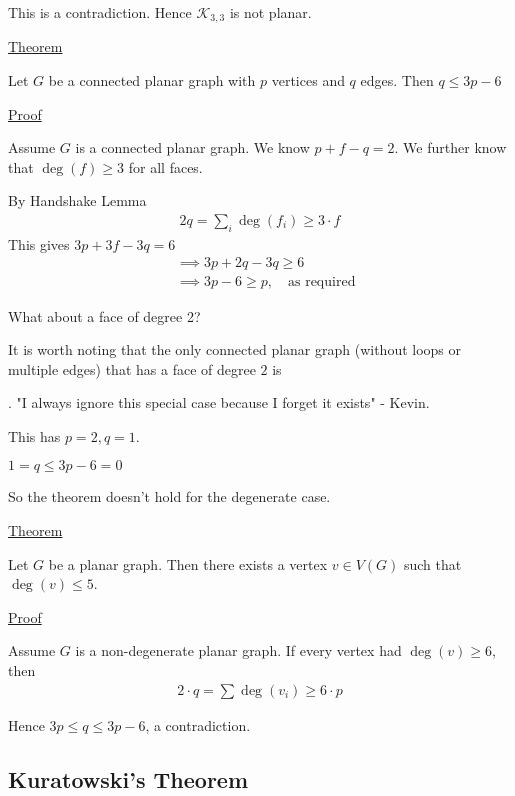 \documentclass{article}
\begin{document}
This is a contradiction. Hence $\mathcal{K}_{3,3}$ is not planar. 

\underline{Theorem}

Let $G$ be a connected planar graph with $p$ vertices and $q$ edges. Then $q \le 3p -6$

\underline{Proof}

Assume $G$ is a connected planar graph. We know $p + f - q = 2$. We further know that $\deg(f) \ge 3$ for all faces. 

By Handshake Lemma
\begin{align*}
    2q = \sum_{i}\deg(f_i) \ge 3 \cdot f
\end{align*}
This gives $3p + 3f - 3q = 6$
\begin{align*}
    &\implies 3p + 2q - 3q \ge 6 \\
    &\implies 3p - 6 \ge p, \quad \text{as required}
\end{align*}

What about a face of degree 2? 

It is worth noting that the only connected planar graph (without loops or multiple edges) that has a face of degree $2$ is . "I always ignore this special case because I forget it exists" - Kevin.

This has $p = 2, q = 1$. 

$1 = q \le 3p - 6 = 0$

So the theorem doesn't hold for the degenerate case. 

\underline{Theorem}

Let $G$ be a planar graph. Then there exists a vertex $v \in V(G)$ such that $\deg(v) \le 5$. 

\underline{Proof}

Assume $G$ is a non-degenerate planar graph. If every vertex had $\deg(v) \ge 6$, then
\begin{align*}
    2 \cdot q = \sum \deg(v_i) \ge 6 \cdot p
\end{align*}

Hence $3p \le q \le 3p - 6$, a contradiction. 

\subsection{Kuratowski's Theorem}
\end{document}
